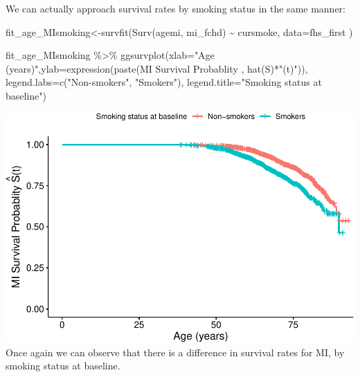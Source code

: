 \documentclass[
]{book}
\newenvironment{Shaded}{\begin{snugshade}}{\end{snugshade}}
\newcommand{\AttributeTok}[1]{\textcolor[rgb]{0.77,0.63,0.00}{#1}}
\newcommand{\FunctionTok}[1]{\textcolor[rgb]{0.00,0.00,0.00}{#1}}
\newcommand{\NormalTok}[1]{#1}
\newcommand{\OtherTok}[1]{\textcolor[rgb]{0.56,0.35,0.01}{#1}}
\newcommand{\SpecialCharTok}[1]{\textcolor[rgb]{0.00,0.00,0.00}{#1}}
\newcommand{\StringTok}[1]{\textcolor[rgb]{0.31,0.60,0.02}{#1}}
\begin{document}
We can actually approach survival rates by smoking status in the same manner:

\begin{Shaded}
\begin{Highlighting}[]
\NormalTok{fit\_age\_MIsmoking}\OtherTok{\textless{}{-}}\FunctionTok{survfit}\NormalTok{(}\FunctionTok{Surv}\NormalTok{(agemi, mi\_fchd) }\SpecialCharTok{\textasciitilde{}}\NormalTok{ cursmoke, }\AttributeTok{data=}\NormalTok{fhs\_first )}

\NormalTok{fit\_age\_MIsmoking }\SpecialCharTok{\%\textgreater{}\%}
\FunctionTok{ggsurvplot}\NormalTok{(}\AttributeTok{xlab=}\StringTok{"Age (years)"}\NormalTok{,}\AttributeTok{ylab=}\FunctionTok{expression}\NormalTok{(}\FunctionTok{paste}\NormalTok{(}\StringTok{\textquotesingle{}MI Survival Probablity \textquotesingle{}}\NormalTok{, }\FunctionTok{hat}\NormalTok{(S)}\SpecialCharTok{*}\StringTok{"(t)"}\NormalTok{)), }\AttributeTok{legend.labs=}\FunctionTok{c}\NormalTok{(}\StringTok{"Non{-}smokers"}\NormalTok{, }\StringTok{"Smokers"}\NormalTok{),}
  \AttributeTok{legend.title=}\StringTok{"Smoking status at baseline"}\NormalTok{)}
\end{Highlighting}
\end{Shaded}

\includegraphics{adv_epi_analysis_files/figure-latex/unnamed-chunk-198-1.pdf}
Once again we can observe that there is a difference in survival rates for MI, by smoking status at baseline.
\end{document}

